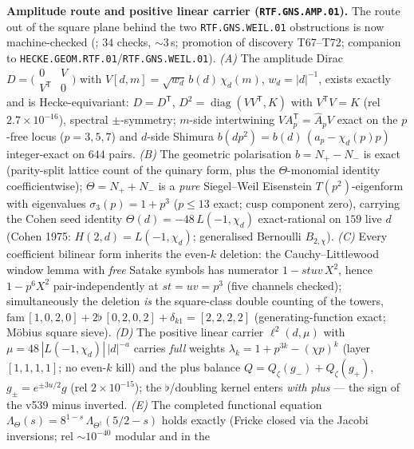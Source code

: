 \par\smallskip\noindent\textbf{Amplitude route and positive linear carrier
(\texttt{RTF.GNS.AMP.01}).}
The route out of the square plane behind the two \texttt{RTF.GNS.WEIL.01}
obstructions is now machine-checked
(; $34$ checks, $\sim3$\,s; promotion of
discovery T67--T72; companion to
\texttt{HECKE.GEOM.RTF.01}/\texttt{RTF.GNS.WEIL.01}).
\emph{(A)} The amplitude Dirac
$D=\bigl(\begin{smallmatrix}0&V\\V^{\mathsf T}&0\end{smallmatrix}\bigr)$ with
$V[d,m]=\sqrt{w_d}\,b(d)\,\chi_d(m)$, $w_d=|d|^{-1}$, exists exactly and is
Hecke-equivariant: $D=D^{\mathsf T}$,
$D^2=\operatorname{diag}(VV^{\mathsf T},K)$ with $V^{\mathsf T}V=K$
(rel $2.7\times10^{-16}$), spectral $\pm$-symmetry; $m$-side intertwining
$VA_p^{\mathsf T}=\hat A_pV$ exact on the $p$-free locus ($p=3,5,7$) and $d$-side
Shimura $b(dp^2)=b(d)\,(a_p-\chi_d(p)p)$ integer-exact on $644$ pairs.
\emph{(B)} The geometric polarisation $b=N_+-N_-$ is exact (parity-split lattice
count of the quinary form, plus the $\Theta$-monomial identity coefficientwise);
$\Theta=N_++N_-$ is a \emph{pure} Siegel--Weil Eisenstein $T(p^2)$-eigenform with
eigenvalues $\sigma_3(p)=1+p^3$ ($p\le13$ exact; cusp component zero), carrying the
Cohen seed identity $\Theta(d)=-48\,L(-1,\chi_d)$ exact-rational on $159$ live $d$
(Cohen 1975: $H(2,d)=L(-1,\chi_d)$; generalised Bernoulli $B_{2,\chi}$).
\emph{(C)} Every coefficient bilinear form inherits the even-$k$ deletion: the
Cauchy--Littlewood window lemma with \emph{free} Satake symbols has numerator
$1-stuv\,X^2$, hence $1-p^6X^2$ pair-independently at $st=uv=p^3$ (five channels
checked); simultaneously the deletion \emph{is} the square-class double counting of
the towers, $\mathrm{fam}\,[1,0,2,0]+2\flat\,[0,2,0,2]+\delta_{k1}=[2,2,2,2]$
(generating-function exact; M\"obius square sieve).
\emph{(D)} The positive linear carrier $\ell^2(d,\mu)$ with
$\mu=48\,|L(-1,\chi_d)|\,|d|^{-a}$ carries \emph{full} weights
$\lambda_k=1+p^{3k}-(\chi p)^k$ (layer $[1,1,1,1]$; no even-$k$ kill) and the plus
balance $Q=Q_\zeta(g_-)+Q_\zeta(g_+)$, $g_\pm=e^{\pm3u/2}g$
(rel $2\times10^{-15}$); the $\flat$/doubling kernel enters \emph{with plus} ---
the sign of the v539 minus inverted.
\emph{(E)} The completed functional equation
$\Lambda_\Theta(s)=8^{1-s}\,\Lambda_{\Theta^\dagger}(5/2-s)$ holds exactly
(Fricke closed via the Jacobi inversions; rel $\sim10^{-40}$ modular and in the

